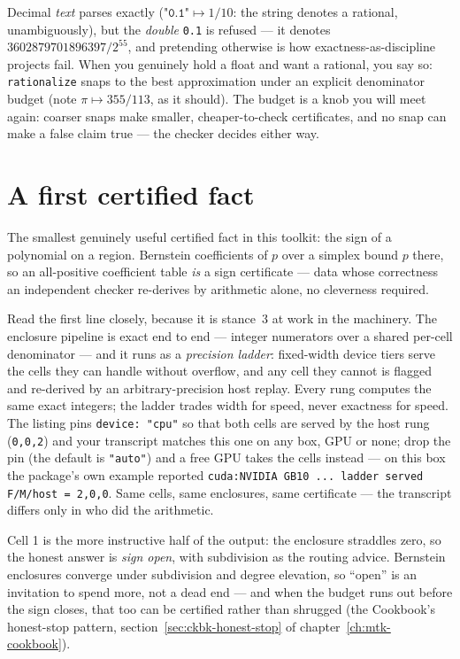 Decimal \emph{text} parses exactly ($\texttt{"0.1"} \mapsto 1/10$:
the string denotes a rational, unambiguously), but the
\emph{double} \texttt{0.1} is refused --- it denotes
$3602879701896397/2^{55}$, and pretending otherwise is how
exactness-as-discipline projects fail. When you genuinely hold a
float and want a rational, you say so: \texttt{rationalize} snaps to
the best approximation under an explicit denominator budget (note
$\pi \mapsto 355/113$, as it should). The budget is a knob you will
meet again: coarser snaps make smaller, cheaper-to-check
certificates, and no snap can make a false claim true --- the
checker decides either way.

\section{A first certified fact}
\label{sec:tut-bernstein}

The smallest genuinely useful certified fact in this toolkit: the
sign of a polynomial on a region. Bernstein coefficients of $p$ over
a simplex bound $p$ there, so an all-positive coefficient table
\emph{is} a sign certificate --- data whose correctness an
independent checker re-derives by arithmetic alone, no cleverness
required.





Read the first line closely, because it is stance~3 at work in the
machinery. The enclosure pipeline is exact end to end --- integer
numerators over a shared per-cell denominator --- and it runs as a
\emph{precision ladder}: fixed-width device tiers serve the cells
they can handle without overflow, and any cell they cannot is flagged
and re-derived by an arbitrary-precision host replay. Every rung
computes the same exact integers; the ladder trades width for speed,
never exactness for speed. The listing pins \texttt{device: "cpu"} so
that both cells are served by the host rung (\texttt{0,0,2}) and your
transcript matches this one on any box, GPU or none; drop the pin
(the default is \texttt{"auto"}) and a free GPU takes the cells
instead --- on this box the package's own example reported
\texttt{cuda:NVIDIA GB10 ...\ ladder served F/M/host = 2,0,0}. Same
cells, same enclosures, same certificate --- the transcript differs
only in who did the arithmetic.

Cell 1 is the more instructive half of the output: the enclosure
straddles zero, so the honest answer is \emph{sign open}, with
subdivision as the routing advice. Bernstein enclosures converge
under subdivision and degree elevation, so ``open'' is an invitation
to spend more, not a dead end --- and when the budget runs out
before the sign closes, that too can be certified rather than
shrugged (the Cookbook's honest-stop pattern,
section~\ref{sec:ckbk-honest-stop} of
chapter~\ref{ch:mtk-cookbook}).

